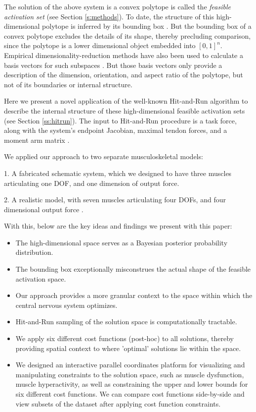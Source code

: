 The solution of the above system is a convex polytope is called the \emph{feasible activation set} (see Section \ref{s:methods}). To date, the structure of this high-dimensional polytope is inferred by its bounding box  \cite{kutch2011muscle,sohn2013cat_bounding_box,Valero-Cuevas2015high-dimensional}.  But the bounding box of a convex polytope excludes the details of its shape, thereby precluding comparison, since the polytope is a lower dimensional object embedded into $[0,1]^n$.  Empirical dimensionality-reduction methods have also been used to calculate a basis vectors for such subspaces \cite{Clewley2008Estimating,davella2005shared,krishnamoorthy2003muscle}. But those basis  vectors only provide a description of the dimension, orientation, and aspect ratio of the polytope, but not of its boundaries or internal  structure.

Here we present a novel application of the well-known Hit-and-Run algorithm \cite{smith1984efficient} to describe the internal structure of these high-dimensional feasible activation sets (see Section \ref{ss:hitrun}). The input to Hit-and-Run procedure is a task force, along with the system's endpoint Jacobian, maximal tendon forces, and a moment arm matrix \cite{Valero-Cuevas2009mathematical}.

We applied our approach to two separate musculoskeletal models:

1. A fabricated schematic system, which we designed to have three muscles articulating one DOF, and one dimension of output force.

2. A realistic model, with seven muscles articulating four DOFs, and four dimensional output force \cite{Valero-Cuevas1998Large}.

With this, below are the key ideas and findings we present with this paper:

\begin{itemize}
\item {The high-dimensional space serves as a Bayesian posterior probability distribution.} %
\item {The bounding box exceptionally misconstrues the actual shape of the feasible activation space.}
\item {Our approach provides a more granular context to the space within which the central nervous system optimizes.}
\item {Hit-and-Run sampling of the solution space is computationally tractable.}%
\item {We apply six different cost functions (post-hoc) to all solutions, thereby providing spatial context to where 'optimal' solutions lie within the space.}
\item {We designed an interactive parallel coordinates platform for visualizing and manipulating constraints to the solution space, such as muscle dysfunction, muscle hyperactivity, as well as constraining the upper and lower bounds for six different cost functions. We can compare cost functions side-by-side and view subsets of the dataset after applying cost function constraints. }
\end{itemize}


